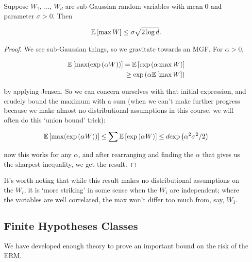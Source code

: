 \documentclass[11pt]{scrartcl}
\begin{document}
\begin{theorem}
\label{max subg upper bound}
Suppose $W_1$, $\dots$, $W_d$ are sub-Gaussian random variables with mean 0 and parameter $\sigma>0$. Then 

\begin{equation}
    \mathbb{E} \left[ \max W \right] \le \sigma \sqrt{2 \log d}.
\end{equation}

\begin{proof}
We see sub-Gaussian things, so we gravitate towards an MGF. For $\alpha > 0$,

\begin{align}
    \mathbb{E} \left[ \max(\text{exp} \left( \alpha W \right)) \right] = \mathbb{E} \left[ \text{exp} \left( \alpha \max W \right) \right] \\
    \ge \text{exp} \left( \alpha \mathbb{E} \left[ \max{W} \right] \right)
\end{align}

by applying Jensen. So we can concern ourselves with that initial expression, and crudely bound the maximum with a sum (when we can't make further progress because we make almost no distributional assumptions in this course, we will often do this `union bound' trick):

\begin{equation}
    \mathbb{E} \left[ \max(\text{exp} \left( \alpha W \right)) \right] \le \sum \mathbb{E} \left[ \text{exp} \left( \alpha W \right) \right] \le d \text{exp} \left( \alpha^2 \sigma^2 / 2 \right)
\end{equation}

now this works for any $\alpha$, and after rearranging and finding the $\alpha$ that gives us the sharpest inequality, we get the result.

\end{proof}
\end{theorem}

It's worth noting that while this result makes no distributional assumptions on the $W_i$, it is `more striking' in some sense when the $W_i$ are independent; where the variables are well correlated, the max won't differ too much from, say, $W_1$.

\subsection{Finite Hypotheses Classes}

We have developed enough theory to prove an important bound on the risk of the ERM.
\end{document}

